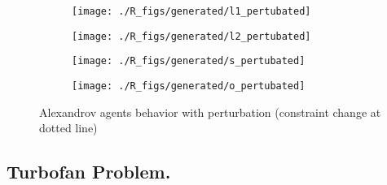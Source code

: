 \begin{figure}[]
\centering
  	\begin{subfigure}[b]{0.4\textwidth}
		\centering
		\texttt{[image: ./R\_figs/generated/l1\_pertubated]}
		\label{alexandrov_res_pert:l1}
	\end{subfigure}
	\begin{subfigure}[b]{0.4\textwidth}
		\centering
		\texttt{[image: ./R\_figs/generated/l2\_pertubated]}
		\label{alexandrov_res_pert:l2}
	\end{subfigure}

	\begin{subfigure}[b]{0.4\textwidth}
		\centering
		\texttt{[image: ./R\_figs/generated/s\_pertubated]}
		\label{alexandrov_res_pert:s}
	\end{subfigure}
	\begin{subfigure}[b]{0.4\textwidth}
		\centering
		\texttt{[image: ./R\_figs/generated/o\_pertubated]}
		\label{alexandrov_res_pert:o}
	\end{subfigure}
	
	\caption{Alexandrov agents behavior with perturbation (constraint change at dotted line)}
	\label{alexandrov_res_pert}
	
\end{figure}

\subsection{Turbofan Problem.}

